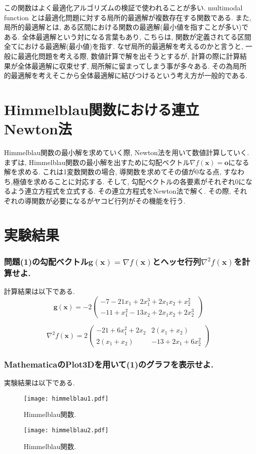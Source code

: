 \documentclass[12pt,a4paper]{jsarticle}
\begin{document}
この関数はよく最適化アルゴリズムの検証で使われることが多い.
multimodal function とは最適化問題に対する局所的最適解が複数存在する関数である.
また, 局所的最適解とは, ある区間における関数の最適解(最小値を指すことが多い)である.
全体最適解という対になる言葉もあり, こちらは, 関数が定義されてる区間全てにおける最適解(最小値)を指す.
なぜ局所的最適解を考えるのかと言うと, 一般に最適化問題を考える際, 数値計算で解を出そうとするが, 計算の際に計算結果が全体最適解に収束せず, 局所解に留まってしまう事が多々ある. その為局所的最適解を考えそこから全体最適解に結びつけるという考え方が一般的である.

\section{Himmelblau関数における連立Newton法}
Himmelblau関数の最小解を求めていく際, Newton法を用いて数値計算していく. まずは, Himmelblau関数の最小解を出すために勾配ベクトル$\nabla f(\bm{x}) = \bm{o}$になる解を求める. これは1変数関数の場合, 導関数を求めてその値が$0$なる点, すなわち,極値を求めることに対応する. そして, 勾配ベクトルの各要素がそれぞれ$0$になるよう連立方程式を立式する. その連立方程式をNewton法で解く. その際, それぞれの導関数が必要になるがヤコビ行列がその機能を行う.

\section{実験結果}
\subsubsection{問題(1)の勾配ベクトル$\bm{g}(\bm{x})=\nabla f(\bm{x})$とヘッセ行列$\nabla^2f(\bm{x})$を計算せよ.}
計算結果は以下である.
\[ \bm{g}(\bm{x}) = -2
\left( \begin{array}{c}
  -7 - 21x_1 + 2x_1^3 + 2x_1x_2 + x_2^2 \\
  -11 + x_1^2 - 13x_2 + 2x_1x_2 + 2x_2^3
\end{array}
\right)\]

\[ \nabla^2f(\bm{x}) = 2
\left( \begin{array}{cc}
  -21 + 6x_1^2 + 2x_2 & 2(x_1 + x_2) \\
  2(x_1 + x_2) & -13 + 2x_1 + 6x_2^2
\end{array}
\right)\]

\subsubsection{MathematicaのPlot3Dを用いて(1)のグラフを表示せよ.}
実験結果は以下である.
\begin{figure}[H]
  \centering
  \texttt{[image: himmelblau1.pdf]}
  \caption{Himmelblau関数.}
\end{figure}
\begin{figure}[H]
  \centering
  \texttt{[image: himmelblau2.pdf]}
  \caption{Himmelblau関数.}
\end{figure}
\end{document}
